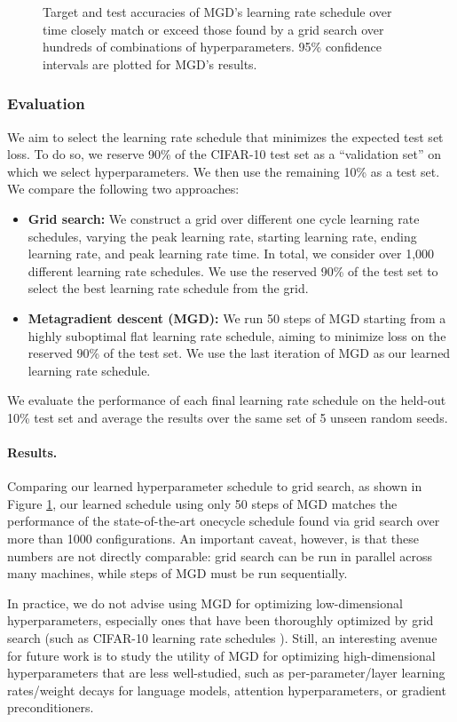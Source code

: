\begin{figure}[tp]
    \centering
    
    \caption{Target and test accuracies of MGD's learning rate schedule
      over time closely match or exceed those found by a grid search over
      hundreds of combinations of hyperparameters.  95\% confidence
    intervals are plotted for MGD's results.}
    \label{fig:mgd_vs_grid}
\end{figure}

\subsubsection{Evaluation}
We aim to select the learning rate schedule that minimizes the
expected test set loss.
To do so, we reserve 90\% of the CIFAR-10 test set as a ``validation set''
on which we select hyperparameters.
We then use the remaining 10\% as a test set. We compare the
following two approaches:
\begin{itemize}
  \item {\bf Grid search:} We construct a grid over different one cycle
    learning rate schedules, varying the peak learning rate, starting learning
    rate, ending learning rate, and peak learning rate time. In total, we
    consider over 1,000 different learning rate schedules. We use the reserved
    90\% of the test set to select the best learning rate schedule
    from the grid.
  \item {\bf Metagradient descent (MGD):} We run 50 steps of
    MGD starting from a highly suboptimal flat learning rate schedule, aiming to
    minimize loss on the reserved 90\% of the test set. We use the
    last iteration
    of MGD as our learned learning rate schedule.
\end{itemize}
We evaluate the performance of each final learning rate schedule on the held-out
10\% test set and average the results over the same set of 5 unseen
random seeds.
 

\paragraph{Results.}
Comparing our learned hyperparameter schedule to grid search,
as shown in Figure \ref{fig:mgd_vs_grid}, our learned schedule
using only 50 steps of MGD matches the performance of the state-of-the-art
onecycle schedule found via grid search over more than 1000 configurations.
An important caveat, however, is that these numbers are not directly comparable:
grid search can be run in parallel across many machines, while steps
of MGD must be run sequentially.

In practice, we do not advise using MGD for optimizing low-dimensional
hyperparameters, especially ones that have been thoroughly optimized by grid
search (such as CIFAR-10 learning rate schedules
\citep{smith2017super,page2018cifar,li2019exponential,jordan202494}). Still, an
interesting avenue for future work is to study the utility of MGD for optimizing
high-dimensional hyperparameters that are less well-studied, such as
per-parameter/layer learning rates/weight decays for language models, attention
hyperparameters, or gradient preconditioners.
